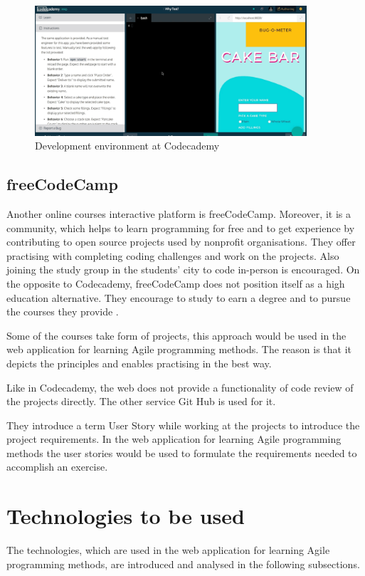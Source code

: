 \begin{figure}[h]
    \centerline{\includegraphics[width=0.9\textwidth]{images/codecademy}}
    \caption{Development environment at Codecademy}
    \label{fig:codecademy}
\end{figure}

\subsection{freeCodeCamp}
Another online courses interactive platform is freeCodeCamp. Moreover, it is a community, which helps to learn programming for free and to get experience by contributing to open source projects used by nonprofit organisations. They offer practising with completing coding challenges and work on the projects. Also joining the study group in the students' city to code in-person is encouraged. On the opposite to Codecademy, freeCodeCamp does not position itself as a high education alternative. They encourage to study to earn a degree and to pursue the courses they provide \cite{feecodecamp}.

Some of the courses take form of projects, this approach would be used in the web application for learning Agile programming methods. The reason is that it depicts the principles and enables practising in the best way. 

Like in Codecademy, the web does not provide a functionality of code review of the projects directly. The other service Git Hub is used for it.

They introduce a term User Story while working at the projects to introduce the project requirements. In the web application for learning Agile programming methods the user stories would be used to formulate the requirements needed to accomplish an exercise.

\section{Technologies to be used}
\label{sect:tech}
The technologies, which are used in the web application for learning Agile programming methods, are introduced and analysed in the following subsections.

